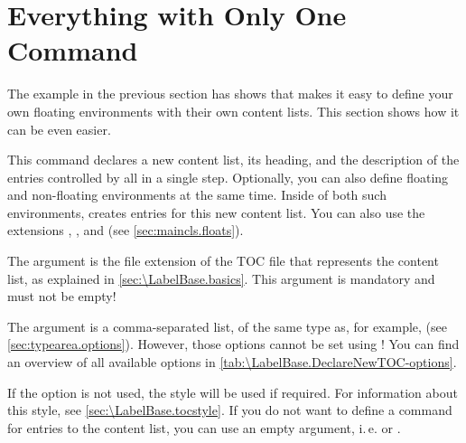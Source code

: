 \section{Everything with Only One Command}

The example in the previous section has shows that  makes it
easy to define your own floating environments with their own content lists.
This section shows how it can be even easier.

\begin{Declaration}
\end{Declaration}
This command declares a new content list,
its heading, and the description of the entries controlled by
 all in a single step. Optionally, you can also define
floating and non-floating environments at the same time. Inside of both such
environments, %
 creates entries
for this new content list. You can also use the \KOMAScript{} extensions
, , and
 (see \autoref{sec:maincls.floats}).

The  argument is the file extension of the TOC file that
represents the content list, as explained in  \autoref{sec:\LabelBase.basics}.
This argument is mandatory and must not be empty!

The  argument is a comma-separated list, of the same type as,
for example,  (see
\autoref{sec:typearea.options}). However, those options
cannot be set using !
You can find an overview of all available options in
\autoref{tab:\LabelBase.DeclareNewTOC-options}.

If the 
option is not used, the  style will be used if required. For
information about this style, see \autoref{sec:\LabelBase.tocstyle}. If you do
not want to define a command for entries to the content list, you can use an
empty argument, i.\,e.  or
.

